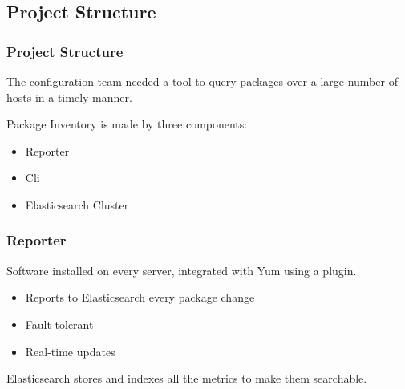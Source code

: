 \documentclass[aspectratio=169]{beamer}
\begin{document}

\subsection{Project Structure}
\begin{frame}
    \frametitle{Project Structure}
    The configuration team needed a tool to query packages over a large
    number of hosts in a timely manner.

    Package Inventory is made by three components:
    \begin{itemize}
        \item Reporter
        \item Cli
        \item Elasticsearch Cluster
    \end{itemize}
\end{frame}


\begin{frame}
    \frametitle{Reporter}

    Software installed on every server, integrated with Yum using a plugin.

    \begin{itemize}
        \item Reports to Elasticsearch every package change
        \item Fault-tolerant
        \item Real-time updates
    \end{itemize}

    Elasticsearch stores and indexes all the metrics to make them searchable.

    \begin{center}
        \vspace{10px}
    \end{center}
\end{frame}

\end{document}

